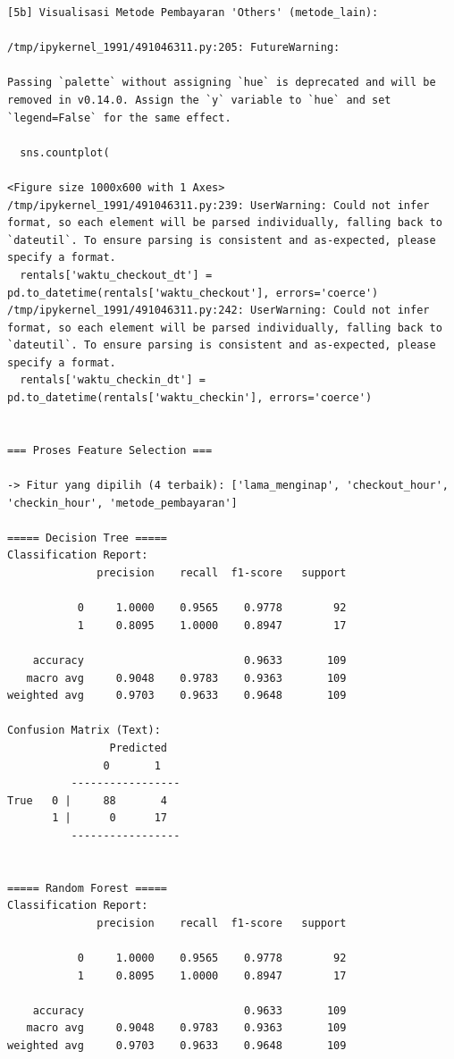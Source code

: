 \begin{lstlisting}[caption={Output 18}]
[5b] Visualisasi Metode Pembayaran 'Others' (metode_lain):

/tmp/ipykernel_1991/491046311.py:205: FutureWarning: 

Passing `palette` without assigning `hue` is deprecated and will be removed in v0.14.0. Assign the `y` variable to `hue` and set `legend=False` for the same effect.

  sns.countplot(

<Figure size 1000x600 with 1 Axes>
/tmp/ipykernel_1991/491046311.py:239: UserWarning: Could not infer format, so each element will be parsed individually, falling back to `dateutil`. To ensure parsing is consistent and as-expected, please specify a format.
  rentals['waktu_checkout_dt'] = pd.to_datetime(rentals['waktu_checkout'], errors='coerce')
/tmp/ipykernel_1991/491046311.py:242: UserWarning: Could not infer format, so each element will be parsed individually, falling back to `dateutil`. To ensure parsing is consistent and as-expected, please specify a format.
  rentals['waktu_checkin_dt'] = pd.to_datetime(rentals['waktu_checkin'], errors='coerce')


=== Proses Feature Selection ===

-> Fitur yang dipilih (4 terbaik): ['lama_menginap', 'checkout_hour', 'checkin_hour', 'metode_pembayaran']

===== Decision Tree =====
Classification Report:
              precision    recall  f1-score   support

           0     1.0000    0.9565    0.9778        92
           1     0.8095    1.0000    0.8947        17

    accuracy                         0.9633       109
   macro avg     0.9048    0.9783    0.9363       109
weighted avg     0.9703    0.9633    0.9648       109

Confusion Matrix (Text):
                Predicted
               0       1
          -----------------
True   0 |     88       4
       1 |      0      17
          -----------------


===== Random Forest =====
Classification Report:
              precision    recall  f1-score   support

           0     1.0000    0.9565    0.9778        92
           1     0.8095    1.0000    0.8947        17

    accuracy                         0.9633       109
   macro avg     0.9048    0.9783    0.9363       109
weighted avg     0.9703    0.9633    0.9648       109


\end{lstlisting}
